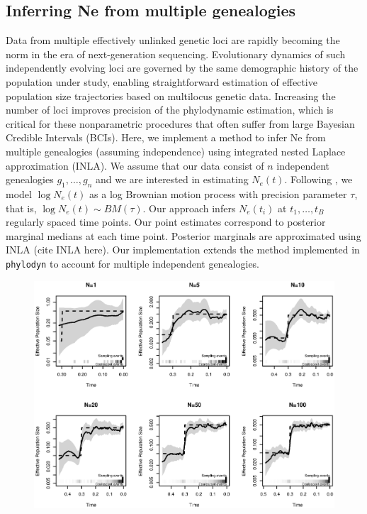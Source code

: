 \documentclass[english,titlepage]{article}
\begin{document}
\subsection*{Inferring Ne from multiple genealogies} 
Data from multiple effectively unlinked genetic loci are rapidly becoming the norm in the era of next-generation sequencing. Evolutionary dynamics of such independently evolving loci are governed by the same demographic history of the population under study, enabling straightforward estimation of effective
population size trajectories based on multilocus genetic data. Increasing the number of loci improves precision of the phylodynamic estimation, which is critical for these nonparametric procedures that often suffer from large Bayesian Credible Intervals (BCIs). Here, we implement a method to infer Ne from multiple genealogies (assuming independence) using integrated nested Laplace approximation (INLA). We assume that our data consist of $n$ independent genealogies $g_{1},\ldots,g_{n}$ and we are interested in estimating $N_{e}(t)$. Following \citet{palacios2012INLA}, we model $\log N_{e}(t)$ as a log Brownian motion process with precision parameter $\tau$, that is, $\log N_{e}(t) \sim BM(\tau)$. Our approach infers $N_{e}(t_{i})$ at $t_{1},\ldots,t_{B}$ regularly spaced time points. Our point estimates correspond to posterior marginal medians at each time point. Posterior marginals are approximated using INLA (cite INLA here). Our implementation extends the method implemented in \texttt{phylodyn} to account for multiple independent genealogies.
\begin{figure}
\begin{center}
      \includegraphics[scale=0.8]{Figures/Bottle_20_independent.eps}    \end{center}
\end{figure}
 
\end{document}
